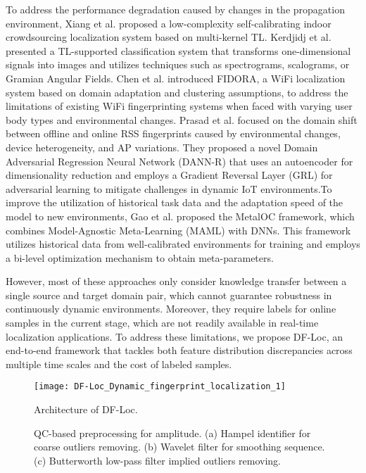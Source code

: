 To address the performance degradation caused by changes in the propagation environment, Xiang et al. \cite{xiang2022crowdsourcing} proposed a low-complexity self-calibrating indoor crowdsourcing localization system based on multi-kernel TL.  Kerdjidj et al. \cite{kerdjidj2024exploiting} presented a TL-supported classification system that transforms one-dimensional signals into images and utilizes techniques such as spectrograms, scalograms, or Gramian Angular Fields. Chen et al. \cite{chen2022fidora} introduced FIDORA, a WiFi localization system based on domain adaptation and clustering assumptions, to address the limitations of existing WiFi fingerprinting systems when faced with varying user body types and environmental changes. Prasad et al. \cite{prasad2023domain} focused on the domain shift between offline and online RSS fingerprints caused by environmental changes, device heterogeneity, and AP variations. They proposed a novel Domain Adversarial Regression Neural Network (DANN-R) that uses an autoencoder for dimensionality reduction and employs a Gradient Reversal Layer (GRL) for adversarial learning to mitigate challenges in dynamic IoT environments.To improve the utilization of historical task data and the adaptation speed of the model to new environments, Gao et al. \cite{gao2023metaloc} proposed the MetalOC framework, which combines Model-Agnostic Meta-Learning (MAML) with DNNs. This framework utilizes historical data from well-calibrated environments for training and employs a bi-level optimization mechanism to obtain meta-parameters.

However, most of these approaches only consider knowledge transfer between a single source and target domain pair, which cannot guarantee robustness in continuously dynamic environments. Moreover, they require labels for online samples in the current stage, which are not readily available in real-time localization applications.  To address these limitations, we propose DF-Loc, an end-to-end framework that tackles both feature distribution discrepancies across multiple time scales and the cost of labeled samples.

\begin{figure*}[!t]
	\centering
	\texttt{[image: DF-Loc\_Dynamic\_fingerprint\_localization\_1]}
	\caption{Architecture of DF-Loc.}
	\label{fig_1}
\end{figure*}

\begin{figure*}[!t]
	\centering
	\hfil
	\hfil
	\caption{QC-based preprocessing for amplitude. (a) Hampel identifier for coarse outliers removing. (b) Wavelet filter for smoothing sequence. (c) Butterworth low-pass filter implied outliers removing.}
	\label{fig_4}
\end{figure*}